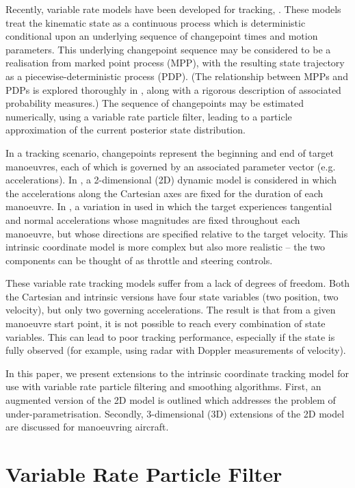 \documentclass[conference]{IEEEtran}
\begin{document}
Recently, variable rate models have been developed for tracking, \cite{Godsill2007a,Godsill2007,Whiteley2011}. These models treat the kinematic state as a continuous process which is deterministic conditional upon an underlying sequence of changepoint times and motion parameters. This underlying changepoint sequence may be considered to be a realisation from marked point process (MPP), with the resulting state trajectory as a piecewise-deterministic process (PDP). (The relationship between MPPs and PDPs is explored thoroughly in \cite{Jacobsen2006}, along with a rigorous description of associated probability measures.) The sequence of changepoints may be estimated numerically, using a variable rate particle filter, leading to a particle approximation of the current posterior state distribution.

In a tracking scenario, changepoints represent the beginning and end of target manoeuvres, each of which is governed by an associated parameter vector (e.g. accelerations). In \cite{Whiteley2011}, a 2-dimensional (2D) dynamic model is considered in which the accelerations along the Cartesian axes are fixed for the duration of each manoeuvre. In \cite{Godsill2007}, a variation in used in which the target experiences tangential and normal accelerations whose magnitudes are fixed throughout each manoeuvre, but whose directions are specified relative to the target velocity. This intrinsic coordinate model is more complex but also more realistic -- the two components can be thought of as throttle and steering controls.

These variable rate tracking models suffer from a lack of degrees of freedom. Both the Cartesian and intrinsic versions have four state variables (two position, two velocity), but only two governing accelerations. The result is that from a given manoeuvre start point, it is not possible to reach every combination of state variables. This can lead to poor tracking performance, especially if the state is fully observed (for example, using radar with Doppler measurements of velocity).

In this paper, we present extensions to the intrinsic coordinate tracking model for use with variable rate particle filtering and smoothing algorithms. First, an augmented version of the 2D model is outlined which addresses the problem of under-parametrisation. Secondly, 3-dimensional (3D) extensions of the 2D model are discussed for manoeuvring aircraft.



\section{Variable Rate Particle Filter}
\end{document}
